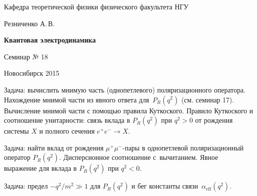 \documentclass[12pt,pagesize,paper=landscape,paper=192mm:108mm]{scrbook}
\begin{document}
\begin{titlepage}
\begin{center}
    Кафедра теоретической физики физического факультета НГУ
    \medskip

    \Large
    Резниченко А.\,В.
    \bigskip

    \huge
    \textbf{Квантовая электродинамика}
    \bigskip

    \Large
    Семинар № 18
    \vfill

    \normalsize
    \vfill

    \normalsize \ccbysa\hspace{0.5em}  Новосибирск 2015
  \end{center}
\end{titlepage}
\newpage

\vspace*{-1em}
\begin{center}
\vfill
  \begin{minipage}{0.65\linewidth}

    Задача: вычислить мнимую часть (однопетлевого) поляризационного
    оператора. Нахождение мнимой части из явного ответа для~$P_R(q^2)$
    (см. семинар 17). Вычисление мнимой части с помощью правила
    Куткоского. Правило Куткоского и соотношение унитарности: связь
    вклада в $P_R(q^2)$ при $q^2>0$ от рождения системы $X$ и полного сечения
    $e^+e^-\to X$.
    \smallskip

    Задача: найти вклад от рождения $\mu^+\mu^-$-пары в однопетлевой
    поляризационный оператор $P_R(q^2)$. Дисперсионное соотношение
    с~вычитанием. Явное выражение для вклада в $P_R(q^2)$ при $q^2<0$.
    \smallskip

    Задача: предел $-q^2/m^2\gg 1$ для $P_R(q^2)$ и бег константы
    связи~$\alpha_{\text{eff}}(q^2)$.

  \end{minipage}
  \vfill

\end{center}
\end{document}
